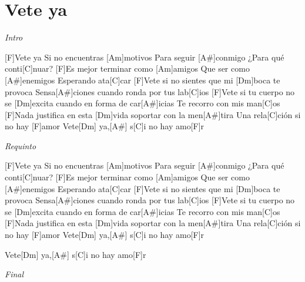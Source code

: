 \section{Vete ya}

\noindent
\vspace{1cm}

\begin{guitar}
	\begin{multicols}{2}
		\par
		\textit{Intro}

		[F]Vete ya
		Si no encuentras [Am]motivos
		Para seguir [A#]conmigo
		¿Para qué conti[C]nuar?
		[F]Es mejor terminar como [Am]amigos
		Que ser como [A#]enemigos
		Esperando ata[C]car
		[F]Vete si no sientes que mi [Dm]boca te provoca
		Sensa[A#]ciones cuando ronda por tus lab[C]ios
		[F]Vete si tu cuerpo no se [Dm]excita cuando en forma de car[A#]icias
		Te recorro con mis man[C]os
		[F]Nada justifica en esta [Dm]vida soportar con la men[A#]tira
		Una rela[C]ción si no hay [F]amor
		Vete[Dm] ya,[A#] s[C]i no hay amo[F]r

		\textit{Requinto}

		[F]Vete ya
		Si no encuentras [Am]motivos
		Para seguir [A#]conmigo
		¿Para qué conti[C]nuar?
		[F]Es mejor terminar como [Am]amigos
		Que ser como [A#]enemigos
		Esperando ata[C]car
		[F]Vete si no sientes que mi [Dm]boca te provoca
		Sensa[A#]ciones cuando ronda por tus lab[C]ios
		[F]Vete si tu cuerpo no se [Dm]excita cuando en forma de car[A#]icias
		Te recorro con mis man[C]os
		[F]Nada justifica en esta [Dm]vida soportar con la men[A#]tira
		Una rela[C]ción si no hay [F]amor
		Vete[Dm] ya,[A#] s[C]i no hay amo[F]r
		\par
		Vete[Dm] ya,[A#] s[C]i no hay amo[F]r


		\textit{Final}
		
\end{multicols}
\end{guitar}
